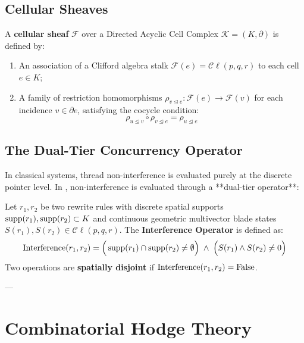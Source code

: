 \subsection{Cellular Sheaves}
\begin{definition}
A \textbf{cellular sheaf} $\mathcal{F}$ over a Directed Acyclic Cell Complex $\mathcal{K} = (K, \partial)$ is defined by:
\begin{enumerate}
    \item An association of a Clifford algebra stalk $\mathcal{F}(e) = \mathcal{C}\ell(p,q,r)$ to each cell $e \in K$;
    \item A family of restriction homomorphisms $\rho_{v \trianglelefteq e} : \mathcal{F}(e) \to \mathcal{F}(v)$ for each incidence $v \in \partial e$, satisfying the cocycle condition:
    \begin{equation}
        \rho_{u \trianglelefteq v} \circ \rho_{v \trianglelefteq e} = \rho_{u \trianglelefteq e}
    \end{equation}
\end{enumerate}
\end{definition}

\subsection{The Dual-Tier Concurrency Operator}
In classical systems, thread non-interference is evaluated purely at the discrete pointer level. In \ToposLang{}, non-interference is evaluated through a **dual-tier operator**:

\begin{definition}
Let $r_1, r_2$ be two rewrite rules with discrete spatial supports $\operatorname{supp}(r_1), \operatorname{supp}(r_2) \subset K$ and continuous geometric multivector blade states $S(r_1), S(r_2) \in \mathcal{C}\ell(p,q,r)$. The \textbf{Interference Operator} is defined as:
\begin{equation}
    \operatorname{Interference}(r_1, r_2) = \Big( \operatorname{supp}(r_1) \cap \operatorname{supp}(r_2) \neq \emptyset \Big) \;\land\; \Big( S(r_1) \wedge S(r_2) \neq 0 \Big)
\end{equation}
Two operations are \textbf{spatially disjoint} if $\operatorname{Interference}(r_1, r_2) = \text{False}$.
\end{definition}

---

\section{Combinatorial Hodge Theory}
\label{sec:combinatorial_hodge}

